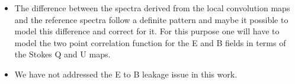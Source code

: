 \begin{itemize}
\item{The difference between the spectra derived from the local convolution maps and the reference spectra follow a definite pattern and maybe it possible to model this difference and correct for it. For this purpose one will have to model the two point correlation function for the E and B fields in terms of the Stokes Q and U maps.}

\item{We have not addressed the E to B leakage issue in this work.}


\end{itemize}
%
